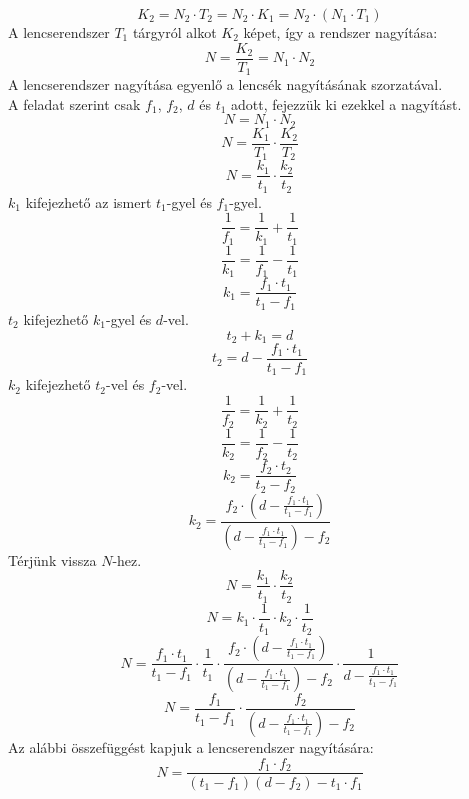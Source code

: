 \documentclass[11pt,a4paper,openany,leqno]{article}
\begin{document}
$$ K_2 = N_2 \cdot T_2 = N_2 \cdot K_1 = N_2 \cdot (N_1 \cdot T_1) $$\indent
A lencserendszer $T_1$ tárgyról alkot $K_2$ képet, így a rendszer nagyítása:\\
$$ N = \frac{K_2}{T_1} = N_1 \cdot N_2 $$\indent
A lencserendszer nagyítása egyenlő a lencsék nagyításának szorzatával.\\ \indent
A feladat szerint csak $f_1$, $f_2$, $d$ és $t_1$ adott, fejezzük ki ezekkel a nagyítást.\\
$$ N = N_1 \cdot N_2 $$
$$ N = \frac{K_1}{T_1} \cdot \frac{K_2}{T_2} $$
$$ N = \frac{k_1}{t_1} \cdot \frac{k_2}{t_2} $$\indent
$k_1$ kifejezhető az ismert $t_1$-gyel és $f_1$-gyel.\\ 
$$ \frac{1}{f_1} = \frac{1}{k_1} + \frac{1}{t_1} $$
$$ \frac{1}{k_1} = \frac{1}{f_1} - \frac{1}{t_1} $$
$$ k_1 = \frac{f_1 \cdot t_1}{t_1-f_1} $$
\indent
$t_2$ kifejezhető $k_1$-gyel és $d$-vel.\\
$$ t_2+k_1 = d $$
$$ t_2 = d - \frac{f_1 \cdot t_1}{t_1-f_1}  $$
\indent
$k_2$ kifejezhető $t_2$-vel és $f_2$-vel.\\
$$ \frac{1}{f_2} = \frac{1}{k_2} + \frac{1}{t_2} $$
$$ \frac{1}{k_2} = \frac{1}{f_2} - \frac{1}{t_2} $$
$$ k_2 = \frac{f_2 \cdot t_2}{t_2-f_2} $$
$$ k_2 = \frac{f_2 \cdot (d - \frac{f_1 \cdot t_1}{t_1-f_1} )}{(d - \frac{f_1 \cdot t_1}{t_1-f_1})-f_2} $$\indent
Térjünk vissza $N$-hez.\\
$$ N = \frac{k_1}{t_1} \cdot \frac{k_2}{t_2} $$
$$ N = k_1\cdot \frac{1}{t_1} \cdot k_2 \cdot\frac{1}{t_2} $$
$$ N = \frac{f_1 \cdot t_1}{t_1-f_1}\cdot \frac{1}{t_1} \cdot \frac{f_2 \cdot (d - \frac{f_1 \cdot t_1}{t_1-f_1} )}{(d - \frac{f_1 \cdot t_1}{t_1-f_1} )-f_2} \cdot\frac{1}{d - \frac{f_1 \cdot t_1}{t_1-f_1} } $$
$$ N = \frac{f_1 }{t_1-f_1} \cdot \frac{f_2}{(d - \frac{f_1 \cdot t_1}{t_1-f_1} )-f_2} $$\indent
Az alábbi összefüggést kapjuk a lencserendszer nagyítására:\\
$$ N =  \frac{f_1\cdot f_2}{(t_1-f_1)(d-f_2) - t_1\cdot f_1} $$


\newpage
\end{document}
